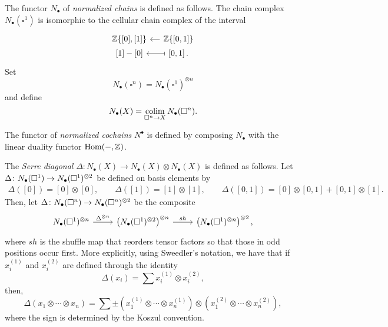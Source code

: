The functor $N_\bullet$ of \textit{normalized chains} is defined as follows. The chain complex $N_\bullet(\square^1)$ is isomorphic to the cellular chain complex of the interval
\begin{equation*}
\begin{tikzcd} [column sep = small, row sep = 0.1pt]
\Z\{[0], [1]\}  & \arrow[l] \Z\{[0,1]\} \\
{[1] - [0]} & \arrow[l, |->] \left[0,1\right].
\end{tikzcd}
\end{equation*}
Set
\begin{equation} \label{eq: chains on I^n}
N_\bullet(\square^n) = N_\bullet(\square^1)^{\otimes n}
\end{equation}
and define
\begin{equation*}
N_\bullet(X) = \operatorname*{colim}_{\square^n \to X} N_\bullet(\square^n).
\end{equation*}

The functor of \textit{normalized cochains} $N^\bullet$ is defined by composing $N_\bullet$ with the linear duality functor $\mathrm{Hom}(-, \mathbb{Z})$.

The \textit{Serre diagonal} $\Delta \colon N_\bullet(X) \to N_\bullet(X) \otimes N_\bullet(X)$ is defined as follows. Let $\Delta \colon N_\bullet(\square^1) \to N_\bullet(\square^1)^{\otimes 2}$ be defined on basis elements by	
\begin{gather*}	
\Delta([0]) = [0] \otimes [0], \qquad 
\Delta([1]) = [1] \otimes [1], \qquad
\Delta([0, 1]) = [0] \otimes [0, 1] + [0, 1] \otimes [1].	
\end{gather*}	
Then, let
$\Delta \colon N_\bullet(\square^n) \to N_\bullet(\square^n)^{\otimes 2}$
be the composite
\begin{equation*}
\begin{tikzcd}
\chains(\square^1)^{\otimes n} \arrow[r, "\Delta^{\otimes n}"] & \left( \chains(\square^1)^{\otimes 2} \right)^{\otimes n} \arrow[r, "sh"] & \left( \chains(\square^1)^{\otimes n} \right)^{\otimes 2},
\end{tikzcd}
\end{equation*}
where $sh$ is the shuffle map that reorders tensor factors so that those in odd positions occur first. More explicitly, using Sweedler's notation, we have that if $x_i^{(1)}$ and $x_i^{(2)}$ are defined through the identity
\begin{equation*}	
\Delta(x_i) = \sum x_i^{(1)} \otimes x_i^{(2)},
\end{equation*}	
then,
\begin{equation} \label{E: Delta}	
\Delta (x_1 \otimes \cdots \otimes x_n) = 	
\sum \pm \left( x_1^{(1)} \otimes \cdots \otimes x_n^{(1)} \right) \otimes 	
\left( x_1^{(2)} \otimes \cdots \otimes x_n^{(2)} \right),
\end{equation}	
where the sign is determined by the Koszul convention.

